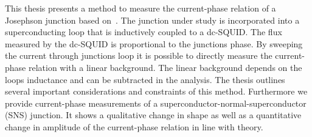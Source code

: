 This thesis presents a method to measure the current-phase relation of a Josephson junction based on~\cite{frolovMeasurementCurrentPhaseRelation2004}. The junction under study is incorporated into a superconducting loop that is inductively coupled to a dc-SQUID. The flux measured by the dc-SQUID is proportional to the junctions phase. By sweeping the current through junctions loop it is possible to directly measure the current-phase relation with a linear background. The linear background depends on the loops inductance and can be subtracted in the analysis. The thesis outlines several important considerations and constraints of this method. Furthermore we provide current-phase measurements of a superconductor-normal-superconductor (SNS) junction. It shows a qualitative change in shape as well as a quantitative change in amplitude of the current-phase relation in line with theory.